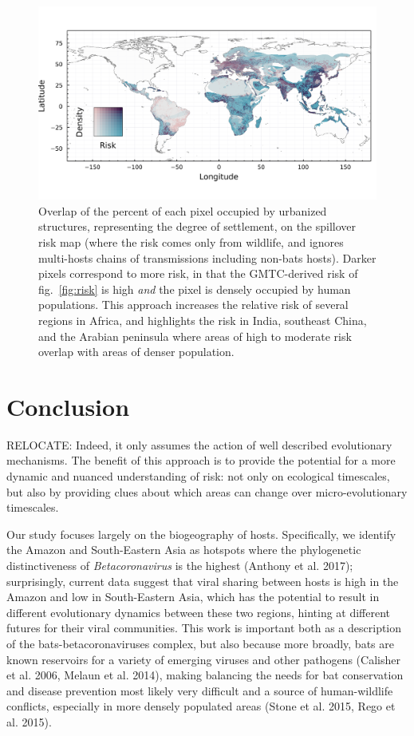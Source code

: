 \documentclass[11pt]{article}
\makeatletter
\def\maxwidth{\ifdim\Gin@nat@width>\linewidth\linewidth
\else\Gin@nat@width\fi}
\let\Oldincludegraphics\includegraphics
\renewcommand{\includegraphics}[1]{\Oldincludegraphics[width=\maxwidth]{#1}}
\makeatother
\begin{document}
\begin{figure}
\hypertarget{fig:compound}{%
\centering
\includegraphics{figures/risk_compounded.png}
\caption{Overlap of the percent of each pixel occupied by urbanized
structures, representing the degree of settlement, on the spillover risk
map (where the risk comes only from wildlife, and ignores multi-hosts
chains of transmissions including non-bats hosts). Darker pixels
correspond to more risk, in that the GMTC-derived risk of
fig.~\ref{fig:risk} is high \emph{and} the pixel is densely occupied by
human populations. This approach increases the relative risk of several
regions in Africa, and highlights the risk in India, southeast China,
and the Arabian peninsula where areas of high to moderate risk overlap
with areas of denser population.}\label{fig:compound}
}
\end{figure}

\hypertarget{conclusion}{%
\section{Conclusion}\label{conclusion}}

RELOCATE: Indeed, it only assumes the action of well described
evolutionary mechanisms. The benefit of this approach is to provide the
potential for a more dynamic and nuanced understanding of risk: not only
on ecological timescales, but also by providing clues about which areas
can change over micro-evolutionary timescales.

Our study focuses largely on the biogeography of hosts. Specifically, we
identify the Amazon and South-Eastern Asia as hotspots where the
phylogenetic distinctiveness of \emph{Betacoronavirus} is the highest
(Anthony et al. 2017); surprisingly, current data suggest that viral
sharing between hosts is high in the Amazon and low in South-Eastern
Asia, which has the potential to result in different evolutionary
dynamics between these two regions, hinting at different futures for
their viral communities. This work is important both as a description of
the bats-betacoronaviruses complex, but also because more broadly, bats
are known reservoirs for a variety of emerging viruses and other
pathogens (Calisher et al. 2006, Melaun et al. 2014), making balancing
the needs for bat conservation and disease prevention most likely very
difficult and a source of human-wildlife conflicts, especially in more
densely populated areas (Stone et al. 2015, Rego et al. 2015).
\end{document}
